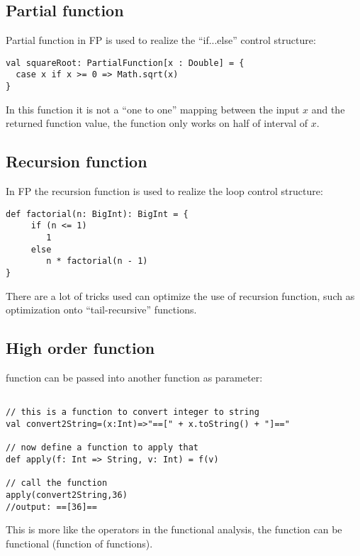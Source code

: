 \documentclass[notheorems, aspectratio=54]{beamer}
\begin{document}
\subsection{Partial function }
\begin{frame}[fragile]

Partial function in FP is used to realize the ``if...else'' control structure: 
\begin{verbatim}
val squareRoot: PartialFunction[x : Double] = {
  case x if x >= 0 => Math.sqrt(x)
} 
\end{verbatim}
In this function it is not a ``one to one'' mapping between the input $x$ and the returned 
function value, the function only works on half of interval of $x$.

  
\end{frame}


\subsection{Recursion function}
\begin{frame}[fragile]

In FP the recursion function is used to realize the loop control structure:
\begin{verbatim}
def factorial(n: BigInt): BigInt = {  
     if (n <= 1)
        1  
     else    
        n * factorial(n - 1)
} 
\end{verbatim}
There are a lot of tricks used can optimize the use of recursion function, 
such as optimization onto ``tail-recursive'' functions.
  
\end{frame}

\subsection{High order function}
\begin{frame}[fragile]

function can be passed into another function as parameter:
\begin{verbatim}

// this is a function to convert integer to string
val convert2String=(x:Int)=>"==[" + x.toString() + "]=="

// now define a function to apply that
def apply(f: Int => String, v: Int) = f(v)

// call the function
apply(convert2String,36)
//output: ==[36]== 
\end{verbatim}
This is more like the operators in the functional analysis, the function
can be functional (function of functions).
  
\end{frame}
\end{document}
